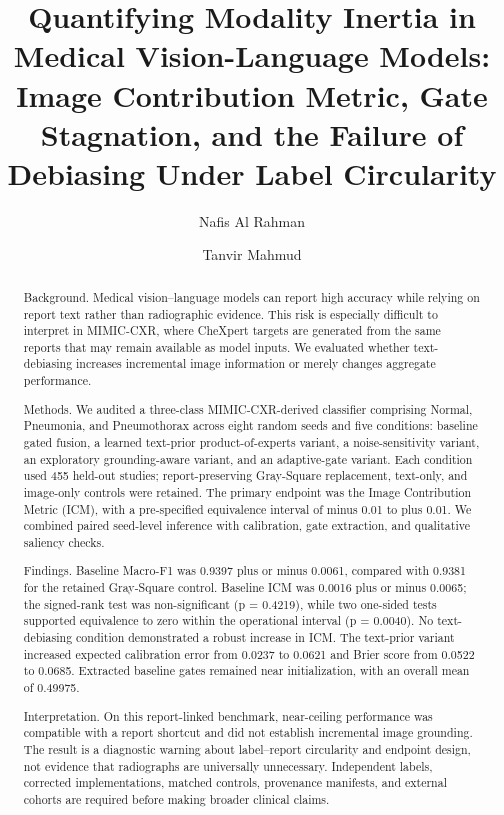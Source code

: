 \documentclass[a4paper,fleqn]{cas-sc}
\begin{document}
\title[mode=title]{Quantifying Modality Inertia in Medical Vision-Language Models: Image Contribution Metric, Gate Stagnation, and the Failure of Debiasing Under Label Circularity}

\author{Nafis Al Rahman}
\author{Tanvir Mahmud}

\begin{abstract}
Background. Medical vision--language models can report high accuracy while
relying on report text rather than radiographic evidence. This risk is
especially difficult to interpret in MIMIC-CXR, where CheXpert targets are
generated from the same reports that may remain available as model inputs. We
evaluated whether text-debiasing increases incremental image information or
merely changes aggregate performance.

Methods. We audited a three-class MIMIC-CXR-derived classifier comprising
Normal, Pneumonia, and Pneumothorax across eight random seeds and five
conditions: baseline gated fusion, a learned text-prior product-of-experts
variant, a noise-sensitivity variant, an exploratory grounding-aware variant,
and an adaptive-gate variant. Each condition used 455 held-out studies;
report-preserving Gray-Square replacement, text-only, and image-only controls
were retained. The primary endpoint was the Image Contribution Metric (ICM),
with a pre-specified equivalence interval of minus 0.01 to plus 0.01. We
combined paired seed-level inference with calibration, gate extraction, and
qualitative saliency checks.

Findings. Baseline Macro-F1 was 0.9397 plus or minus 0.0061, compared with
0.9381 for the retained Gray-Square control. Baseline ICM was 0.0016 plus or
minus 0.0065; the signed-rank test was non-significant (p = 0.4219), while two
one-sided tests supported equivalence to zero within the operational interval
(p = 0.0040). No text-debiasing condition demonstrated a robust increase in
ICM. The text-prior variant increased expected calibration error from 0.0237
to 0.0621 and Brier score from 0.0522 to 0.0685. Extracted baseline gates
remained near initialization, with an overall mean of 0.49975.

Interpretation. On this report-linked benchmark, near-ceiling performance was
compatible with a report shortcut and did not establish incremental image
grounding. The result is a diagnostic warning about label--report circularity
and endpoint design, not evidence that radiographs are universally unnecessary.
Independent labels, corrected implementations, matched controls, provenance
manifests, and external cohorts are required before making broader clinical
claims.
\end{abstract}
\end{document}
